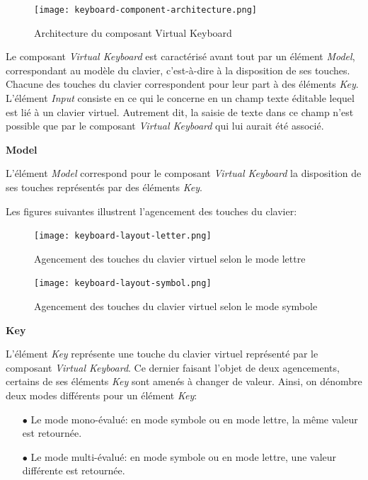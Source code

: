 \documentclass[11pt,a4paper,oldfontcommands]{memoir}
\begin{document}
\begin{figure}[H]
\centering
\texttt{[image: keyboard-component-architecture.png]}
\caption{Architecture du composant Virtual Keyboard}
\end{figure}

Le composant \textit{Virtual Keyboard} est caractérisé avant tout par un élément \textit{Model}, correspondant au modèle du clavier, c'est-à-dire à la disposition de ses touches. Chacune des touches du clavier correspondent pour leur part à des éléments \textit{Key}. L'élément \textit{Input} consiste en ce qui le concerne en un champ texte éditable lequel est lié à un clavier virtuel. Autrement dit, la saisie de texte dans ce champ n'est possible que par le composant \textit{Virtual Keyboard} qui lui aurait été associé.

\textbf{Model}

L'élément \textit{Model} correspond pour le composant \textit{Virtual Keyboard} la disposition de ses touches représentés par des éléments \textit{Key}.

Les figures suivantes illustrent l'agencement des touches du clavier:

\begin{figure}[H]
\centering
\texttt{[image: keyboard-layout-letter.png]}
\caption{Agencement des touches du clavier virtuel selon le mode lettre}
\end{figure}

\begin{figure}[H]
\centering
\texttt{[image: keyboard-layout-symbol.png]}
\caption{Agencement des touches du clavier virtuel selon le mode symbole}
\end{figure}

\newpage

\textbf{Key}

L'élément \textit{Key} représente une touche du clavier virtuel représenté par le composant \textit{Virtual Keyboard}. Ce dernier faisant l'objet de deux agencements, certains de ses éléments \textit{Key} sont amenés à changer de valeur. Ainsi, on dénombre deux modes différents pour un élément \textit{Key}:

\begin{itemize}
\item[$\bullet$] Le mode mono-évalué: en mode symbole ou en mode lettre, la même valeur est retournée.
\item[$\bullet$] Le mode multi-évalué: en mode symbole ou en mode lettre, une valeur différente est retournée.
\end{itemize}
\end{document}
